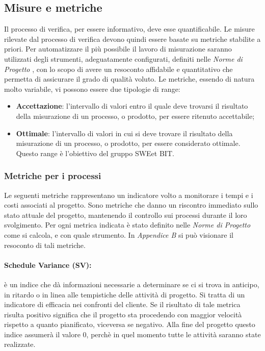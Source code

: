 \subsection{Misure e metriche}
Il processo di verifica, per essere informativo, deve esse quantificabile. Le misure rilevate
dal processo di verifica devono quindi essere basate su metriche stabilite a priori. Per automatizzare il più possibile il lavoro di misurazione saranno utilizzati degli strumenti, adeguatamente configurati, definiti nelle \emph{Norme di Progetto \VersioneNP{}}, con lo scopo di avere un resoconto affidabile e quantitativo che permetta di assicurare il grado di qualità voluto.
Le metriche, essendo di natura molto variabile, vi possono essere due tipologie di range:
\begin{itemize}
\item \textbf{Accettazione}: l'intervallo di valori entro il quale deve trovarsi il risultato della misurazione di un processo, o prodotto, per essere ritenuto accettabile;
\item \textbf{Ottimale}: l'intervallo di valori in cui si deve trovare il risultato della misurazione di un processo, o prodotto, per essere considerato ottimale.
    Questo range è l'obiettivo del gruppo SWEet BIT.
\end{itemize}

\subsubsection{Metriche per i processi}
Le seguenti metriche rappresentano un indicatore volto a monitorare i tempi e i costi associati al progetto. Sono metriche che danno un riscontro immediato sullo stato attuale del progetto, mantenendo il controllo sui processi durante il loro svolgimento.\linebreak
Per ogni metrica indicata è stato definito nelle \emph{Norme di Progetto \VersioneNP{}} come si calcola, e con quale strumento. In \emph{Appendice B} si può visionare il resoconto di tali metriche.

\paragraph{Schedule Variance (SV):} è un indice che dà informazioni necessarie a determinare se ci si trova in anticipo, in ritardo o in linea alle tempistiche delle attività di progetto. Si tratta di un indicatore di efficacia nei confronti del cliente. Se il risultato di tale metrica risulta positivo significa che il progetto sta procedendo con maggior velocità rispetto a quanto pianificato, viceversa
se negativo. Alla fine del progetto questo indice assumerà il valore 0, perchè in quel momento tutte le attività saranno state realizzate.


